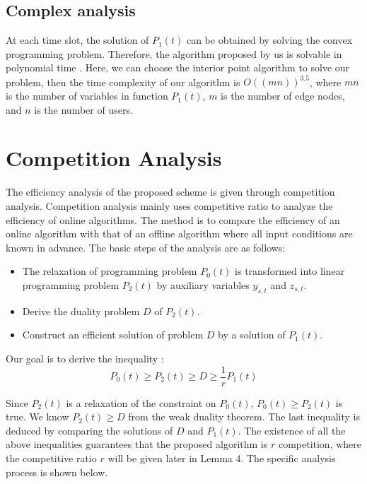\documentclass[journal,article,submit,pdftex,moreauthors]{Definitions/mdpi}
\begin{document}
\subsection{Complex analysis}

At each time slot, the solution of $P_1(t)$ can be obtained by solving the convex programming problem. Therefore, the algorithm proposed by us is solvable in polynomial time \cite{Bubeck2015}. Here, we can choose the interior point algorithm to solve our problem, then the time complexity of our algorithm is $O((mn))^{3.5}$, where $mn$ is the number of variables in function $P_1(t)$, $m$ is the number of edge nodes, and $n$ is the number of users.
\section{Competition Analysis}

The efficiency analysis of the proposed scheme is given through competition analysis. Competition analysis mainly uses competitive ratio to analyze the efficiency of online algorithms. The method is to compare the efficiency of an online algorithm with that of an offline algorithm where all input conditions are known in advance. The basic steps of the analysis are as follows:
\begin{itemize}

    \item The relaxation of programming problem $P_0(t)$ is transformed into linear programming problem $P_2(t)$ by auxiliary variables $y_{s,t}$ and $z_{s,t}$.

    \item Derive the duality problem $D$ of $P_2(t)$.

    \item Construct an efficient solution of problem $D$ by a solution of $P_1(t)$.
\end{itemize}


  Our goal is to derive the inequality \cite{WANG} :
\begin{equation}
P_0(t)\ge P_2(t) \ge D \ge \frac{1}{r} P_1(t)
\end{equation}


Since $ P_2(t)$ is a relaxation of the constraint on $ P_0(t)$, $ P_0(t) \ge P_2(t)$ is true. We know $ P_2(t) \ge D$ from the weak duality theorem. The last inequality is deduced by comparing the solutions of $D$ and $ P_1(t)$.  The existence of all the above inequalities guarantees that the proposed algorithm is $r$ competition, where the competitive ratio $r$ will be given later in Lemma 4. The specific analysis process is shown below.
\end{document}
